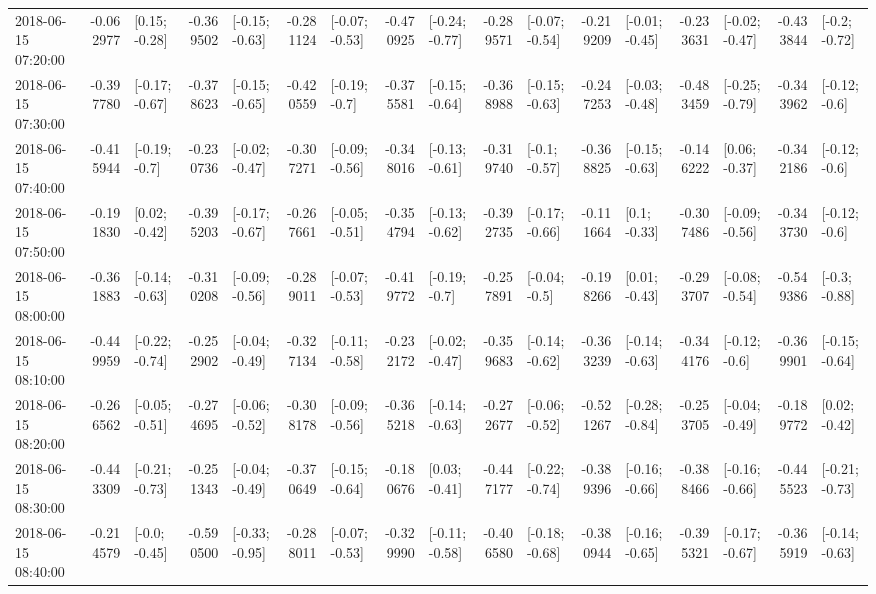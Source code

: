 \begin{tabular}{lrlrlrlrlrlrlrlrl}
2018-06-15 07:20:00 & -0.062977 &   [0.15; -0.28] & -0.369502 &  [-0.15; -0.63] & -0.281124 &  [-0.07; -0.53] & -0.470925 &  [-0.24; -0.77] & -0.289571 &  [-0.07; -0.54] & -0.219209 &  [-0.01; -0.45] & -0.233631 &  [-0.02; -0.47] & -0.433844 &   [-0.2; -0.72] \\
2018-06-15 07:30:00 & -0.397780 &  [-0.17; -0.67] & -0.378623 &  [-0.15; -0.65] & -0.420559 &   [-0.19; -0.7] & -0.375581 &  [-0.15; -0.64] & -0.368988 &  [-0.15; -0.63] & -0.247253 &  [-0.03; -0.48] & -0.483459 &  [-0.25; -0.79] & -0.343962 &   [-0.12; -0.6] \\
2018-06-15 07:40:00 & -0.415944 &   [-0.19; -0.7] & -0.230736 &  [-0.02; -0.47] & -0.307271 &  [-0.09; -0.56] & -0.348016 &  [-0.13; -0.61] & -0.319740 &   [-0.1; -0.57] & -0.368825 &  [-0.15; -0.63] & -0.146222 &   [0.06; -0.37] & -0.342186 &   [-0.12; -0.6] \\
2018-06-15 07:50:00 & -0.191830 &   [0.02; -0.42] & -0.395203 &  [-0.17; -0.67] & -0.267661 &  [-0.05; -0.51] & -0.354794 &  [-0.13; -0.62] & -0.392735 &  [-0.17; -0.66] & -0.111664 &    [0.1; -0.33] & -0.307486 &  [-0.09; -0.56] & -0.343730 &   [-0.12; -0.6] \\
2018-06-15 08:00:00 & -0.361883 &  [-0.14; -0.63] & -0.310208 &  [-0.09; -0.56] & -0.289011 &  [-0.07; -0.53] & -0.419772 &   [-0.19; -0.7] & -0.257891 &   [-0.04; -0.5] & -0.198266 &   [0.01; -0.43] & -0.293707 &  [-0.08; -0.54] & -0.549386 &   [-0.3; -0.88] \\
2018-06-15 08:10:00 & -0.449959 &  [-0.22; -0.74] & -0.252902 &  [-0.04; -0.49] & -0.327134 &  [-0.11; -0.58] & -0.232172 &  [-0.02; -0.47] & -0.359683 &  [-0.14; -0.62] & -0.363239 &  [-0.14; -0.63] & -0.344176 &   [-0.12; -0.6] & -0.369901 &  [-0.15; -0.64] \\
2018-06-15 08:20:00 & -0.266562 &  [-0.05; -0.51] & -0.274695 &  [-0.06; -0.52] & -0.308178 &  [-0.09; -0.56] & -0.365218 &  [-0.14; -0.63] & -0.272677 &  [-0.06; -0.52] & -0.521267 &  [-0.28; -0.84] & -0.253705 &  [-0.04; -0.49] & -0.189772 &   [0.02; -0.42] \\
2018-06-15 08:30:00 & -0.443309 &  [-0.21; -0.73] & -0.251343 &  [-0.04; -0.49] & -0.370649 &  [-0.15; -0.64] & -0.180676 &   [0.03; -0.41] & -0.447177 &  [-0.22; -0.74] & -0.389396 &  [-0.16; -0.66] & -0.388466 &  [-0.16; -0.66] & -0.445523 &  [-0.21; -0.73] \\
2018-06-15 08:40:00 & -0.214579 &   [-0.0; -0.45] & -0.590500 &  [-0.33; -0.95] & -0.288011 &  [-0.07; -0.53] & -0.329990 &  [-0.11; -0.58] & -0.406580 &  [-0.18; -0.68] & -0.380944 &  [-0.16; -0.65] & -0.395321 &  [-0.17; -0.67] & -0.365919 &  [-0.14; -0.63] \\

\end{tabular}

